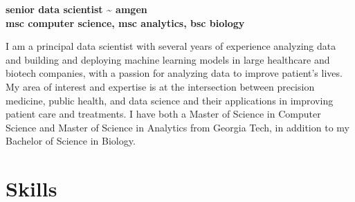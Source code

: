 \documentclass[12pt,a4paper]{moderncv}
\begin{document}
\vspace*{-4\baselineskip}
\makecvtitle
\vspace{-1.5\baselineskip}

\begin{flushright}
\textbf{\large senior data scientist \textasciitilde{} amgen} \\
\textbf{\large msc computer science, msc analytics, bsc biology} \\
\end{flushright}

I am a principal data scientist with several years of experience analyzing data and building and deploying machine learning models in large healthcare and biotech companies, with a passion for analyzing data to improve patient's lives.  
My area of interest and expertise is at the intersection between precision medicine, public health, and data science and their applications in improving patient care and treatments.  I have both a Master of Science in Computer Science and Master of Science in Analytics from Georgia Tech, in addition to my Bachelor of Science in Biology. \\

\section{Skills}
\end{document}

